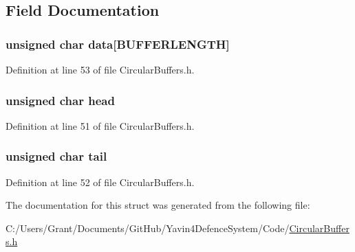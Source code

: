 \subsection{Field Documentation}
\hypertarget{structcircular_buffer_ad7b57ba90694482456be1fbab7de4aec}{
\subsubsection[{data}]{\setlength{\rightskip}{0pt plus 5cm}unsigned char data\mbox{[}{\bf B\+U\+F\+F\+E\+R\+L\+E\+N\+G\+T\+H}\mbox{]}}}\label{structcircular_buffer_ad7b57ba90694482456be1fbab7de4aec}


Definition at line 53 of file Circular\+Buffers.\+h.

\hypertarget{structcircular_buffer_a47f7e6109597e5c1c227993c0ce5f560}{
\subsubsection[{head}]{\setlength{\rightskip}{0pt plus 5cm}unsigned char head}}\label{structcircular_buffer_a47f7e6109597e5c1c227993c0ce5f560}


Definition at line 51 of file Circular\+Buffers.\+h.

\hypertarget{structcircular_buffer_af18a1d7542e277284c4794593b049258}{
\subsubsection[{tail}]{\setlength{\rightskip}{0pt plus 5cm}unsigned char tail}}\label{structcircular_buffer_af18a1d7542e277284c4794593b049258}


Definition at line 52 of file Circular\+Buffers.\+h.



The documentation for this struct was generated from the following file\+:\begin{DoxyCompactItemize}
\item 
C\+:/\+Users/\+Grant/\+Documents/\+Git\+Hub/\+Yavin4\+Defence\+System/\+Code/\hyperlink{_circular_buffers_8h}{Circular\+Buffers.\+h}\end{DoxyCompactItemize}
